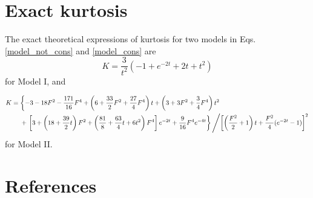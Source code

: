 \documentclass[aps,pre,twocolumn,groupedaddress,longbibliography]{revtex4-2}
\begin{document}
\section{Exact kurtosis}\label{App3}
The exact theoretical expressions of kurtosis for two models in Eqs. \eqref{model_not_cons} and \eqref{model_cons} are
\begin{equation}\label{K1-exact}
  K=\frac{3}{t^2}(-1+e^{-2t}+2t+t^2)
\end{equation}
for Model I, and
\begin{widetext}
\begin{equation}\label{K2-exact}
  \begin{split}
  K&=\left\{-3-18F^2-\frac{171}{16}F^4+\left(6+\frac{33}{2}F^2+\frac{27}{4}F^4\right)t
    +\left(3+3F^2+\frac{3}{4}F^4\right)t^2 \right.\\
&~~~~+ \left. \left[3+\left(18+\frac{39}{2}t\right)F^2
    +\left(\frac{81}{8}+\frac{63}{4}t+6t^2\right)F^4\right]e^{-2t}+\frac{9}{16}F^4e^{-4t}  \right\}
\left/ \left[\left(\frac{F^2}{2}+1\right)t+\frac{F^2}{4}(e^{-2t}-1)\right]^2                        \right.
\end{split}
\end{equation}
for Model II.
\end{widetext}


\section*{References}

\end{document}
